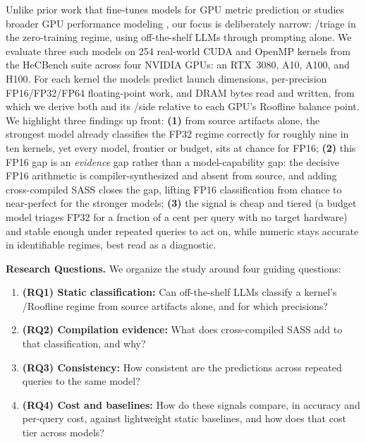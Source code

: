 Unlike prior work that fine-tunes models for GPU metric prediction \cite{wangOmniwisePredictingGPU2025} or studies broader GPU performance modeling \cite{leeForecastingGPUPerformance2025,nguyen-nhatLLMPerfGPUPerformance2024}, our focus is deliberately narrow: \bandwidthbound/\computebound triage in the zero-training regime, using off-the-shelf LLMs through prompting alone.
We evaluate three such models on 254 real-world CUDA and OpenMP kernels from the HeCBench suite \cite{HeCBenchMasterZjinlcf} across four NVIDIA GPUs: an RTX~3080, A10, A100, and H100.
For each kernel the models predict launch dimensions, per-precision FP16/FP32/FP64 floating-point work, and DRAM bytes read and written, from which we derive both \rai and its \bandwidthbound/\computebound side relative to each GPU's Roofline balance point.
We highlight three findings up front:
\textbf{(1)} from source artifacts alone, the strongest model already classifies the FP32 regime correctly for roughly nine in ten kernels, yet every model, frontier or budget, sits at chance for FP16;
\textbf{(2)} this FP16 gap is an \emph{evidence} gap rather than a model-capability gap: the decisive FP16 arithmetic is compiler-synthesized and absent from source, and adding cross-compiled SASS closes the gap, lifting FP16 classification from chance to near-perfect for the stronger models;
\textbf{(3)} the signal is cheap and tiered (a budget model triages FP32 for a fraction of a cent per query with no target hardware) and stable enough under repeated queries to act on, while numeric \rai stays accurate in identifiable regimes, best read as a diagnostic.

\noindent\textbf{Research Questions.}
We organize the study around four guiding questions:
\begin{enumerate}[leftmargin=0em, label={}, itemindent=0pt]
  \item \textbf{(RQ1) Static classification:} Can off-the-shelf LLMs classify a kernel's \bandwidthbound/\computebound Roofline regime from source artifacts alone, and for which precisions?
  \item \textbf{(RQ2) Compilation evidence:} What does cross-compiled SASS add to that classification, and why?
  \item \textbf{(RQ3) Consistency:} How consistent are the predictions across repeated queries to the same model?
  \item \textbf{(RQ4) Cost and baselines:} How do these signals compare, in accuracy and per-query cost, against lightweight static baselines, and how does that cost tier across models?
\end{enumerate}

